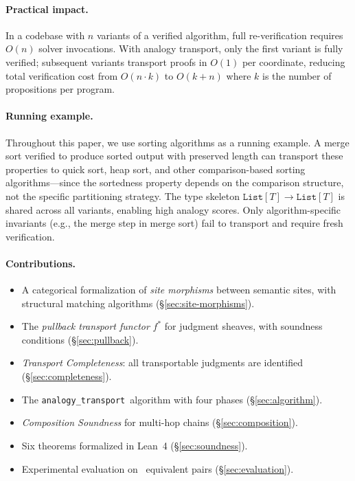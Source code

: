 \documentclass[11pt]{article}
\newcommand{\AnalogyTransport}{\texttt{analogy\_transport}}
\begin{document}
\paragraph{Practical impact.}
In a codebase with $n$ variants of a verified algorithm, full
re-verification requires $O(n)$ solver invocations.  With analogy
transport, only the first variant is fully verified; subsequent
variants transport proofs in $O(1)$ per coordinate, reducing total
verification cost from $O(n \cdot k)$ to $O(k + n)$ where $k$ is the
number of propositions per program.

\paragraph{Running example.}
Throughout this paper, we use sorting algorithms as a running example.
A merge sort verified to produce sorted output with preserved length
can transport these properties to quick sort, heap sort, and other
comparison-based sorting algorithms---since the sortedness property
depends on the comparison structure, not the specific partitioning
strategy.  The type skeleton $\texttt{List}[T] \to \texttt{List}[T]$
is shared across all variants, enabling high analogy scores.  Only
algorithm-specific invariants (e.g., the merge step in merge sort)
fail to transport and require fresh verification.

\paragraph{Contributions.}
\begin{itemize}[noitemsep]
  \item A categorical formalization of \emph{site morphisms} between
        semantic sites, with structural matching algorithms
        (§\ref{sec:site-morphisms}).
  \item The \emph{pullback transport functor} $f^{*}$ for judgment
        sheaves, with soundness conditions (§\ref{sec:pullback}).
  \item \emph{Transport Completeness}: all transportable judgments are
        identified (§\ref{sec:completeness}).
  \item The \AnalogyTransport\ algorithm with four phases
        (§\ref{sec:algorithm}).
  \item \emph{Composition Soundness} for multi-hop chains
        (§\ref{sec:composition}).
  \item Six theorems formalized in Lean~4
        (§\ref{sec:soundness}).
  \item Experimental evaluation on \compEquivPairs\ equivalent pairs
        (§\ref{sec:evaluation}).
\end{itemize}
\end{document}
